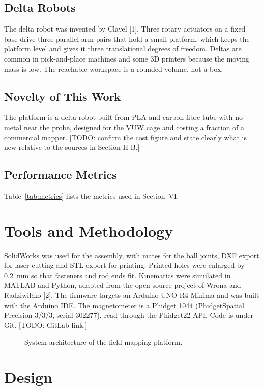 \documentclass[conference]{IEEEtran}
\begin{document}
\subsection{Delta Robots}
The delta robot was invented by Clavel [1]. Three rotary actuators on a fixed base
drive three parallel arm pairs that hold a small platform, which keeps the
platform level and gives it three translational degrees of freedom. Deltas are
common in pick-and-place machines and some 3D printers because the moving mass is
low. The reachable workspace is a rounded volume, not a box.

\subsection{Novelty of This Work}
The platform is a delta robot built from PLA and carbon-fibre tube with no metal near
the probe, designed for the VUW cage and costing a fraction of a commercial mapper.
[TODO: confirm the cost figure and state clearly what is new relative to the sources
in Section II-B.]

\subsection{Performance Metrics}
Table~\ref{tab:metrics} lists the metrics used in Section~VI.

\section{Tools and Methodology}
SolidWorks was used for the assembly, with mates for the ball joints, DXF export for
laser cutting and STL export for printing. Printed holes were enlarged by
\SI{0.2}{mm} so that fasteners and rod ends fit. Kinematics were simulated in MATLAB
and Python, adapted from the open-source project of Wrona and Radziwi\l{}\l{}ko [2].
The firmware targets an Arduino UNO R4 Minima and was built with the Arduino IDE.
The magnetometer is a Phidget 1044 (PhidgetSpatial Precision 3/3/3, serial 302277),
read through the Phidget22 API. Code is under Git.
[TODO: GitLab link.]

\begin{figure}[t]
\caption{System architecture of the field mapping platform.}
\end{figure}

\section{Design}
\end{document}
